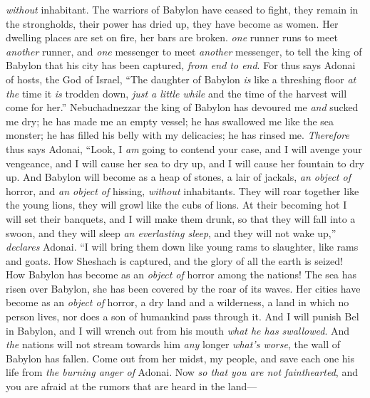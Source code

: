 \begin{biblechapter}
\textit{without} inhabitant.
\verse The warriors of Babylon have ceased to fight, 
they remain in the strongholds, 
their power has dried up, 
they have become as women. 
Her dwelling places are set on fire, 
her bars are broken.
\verse \textit{one} runner runs to meet \textit{another} runner, 
and \textit{one} messenger to meet \textit{another} messenger, 
to tell the king of Babylon that his city has been captured, 
\textit{from end to end}.
\verse For thus says Adonai of hosts, the God of Israel,
\verse “The daughter of Babylon \textit{is} like a threshing floor 
\textit{at the} time it \textit{is} trodden down, 
\textit{just a little while} 
and the time of the harvest will come for her.”
\verse Nebuchadnezzar the king of Babylon 
has devoured me \textit{and} sucked me dry; 
he has made me an empty vessel; 
he has swallowed me like the sea monster; 
he has filled his belly with my delicacies; 
he has rinsed me.
\verse \textit{Therefore} thus says Adonai,
\verse “Look, I \textit{am} going to contend your case, 
and I will avenge your vengeance, 
and I will cause her sea to dry up, 
and I will cause her fountain to dry up.
\verse And Babylon will become as a heap of stones, 
a lair of jackals, 
\textit{an object of} horror, and \textit{an object of} hissing, 
\textit{without} inhabitants.
\verse They will roar together like the young lions, 
they will growl like the cubs of lions.
\verse At their becoming hot I will set their banquets, 
and I will make them drunk, 
so that they will fall into a swoon, 
and they will sleep \textit{an everlasting sleep}, 
and they will not wake up,” \textit{declares} Adonai.
\verse “I will bring them down like young rams to slaughter, 
like rams and goats.
\verse How Sheshach is captured, 
and the glory of all the earth is seized! 
How Babylon has become as an \textit{object of} horror 
among the nations!
\verse The sea has risen over Babylon, 
she has been covered by the roar of its waves.
\verse Her cities have become as an \textit{object of} horror, 
a dry land and a wilderness, 
a land in which no person lives, 
nor does a son of humankind pass through it.
\verse And I will punish Bel in Babylon, 
and I will wrench out from his mouth \textit{what he has swallowed}. 
And \textit{the} nations will not stream towards him \textit{any} longer 
\textit{what’s worse}, the wall of Babylon has fallen.
\verse Come out from her midst, my people, 
and save each one his life 
from \textit{the burning anger of} Adonai.
\verse Now \textit{so that you are not fainthearted}, 
and you are afraid at the rumors that are heard in the land— 

\end{biblechapter}
